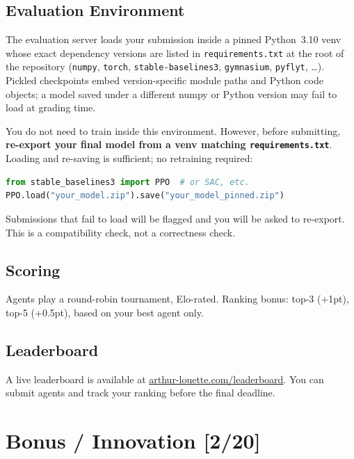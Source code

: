 \documentclass[11pt,a4paper]{article}
\newcommand{\pts}[1]{\hfill{\normalfont\normalsize\color{pts} [#1/20]}}
\begin{document}
\subsection{Evaluation Environment}
\label{sec:eval_env}

The evaluation server loads your submission inside a pinned Python~3.10 venv whose exact dependency versions are listed in \texttt{requirements.txt} at the root of the repository (\texttt{numpy}, \texttt{torch}, \texttt{stable-baselines3}, \texttt{gymnasium}, \texttt{pyflyt}, \ldots). Pickled checkpoints embed version-specific module paths and Python code objects; a model saved under a different numpy or Python version may fail to load at grading time.

You do not need to train inside this environment. However, before submitting, \textbf{re-export your final model from a venv matching \texttt{requirements.txt}}. Loading and re-saving is sufficient; no retraining required:

\begin{lstlisting}[language=Python, numbers=none]
from stable_baselines3 import PPO  # or SAC, etc.
PPO.load("your_model.zip").save("your_model_pinned.zip")
\end{lstlisting}

Submissions that fail to load will be flagged and you will be asked to re-export. This is a compatibility check, not a correctness check.

\subsection{Scoring}

Agents play a round-robin tournament, Elo-rated. Ranking bonus: top-3 (+1pt), top-5 (+0.5pt), based on your best agent only.

\subsection{Leaderboard}

A live leaderboard is available at \href{https://arthur-louette.com/leaderboard}{arthur-louette.com/leaderboard}. You can submit agents and track your ranking before the final deadline.

\section{Bonus / Innovation\pts{2}}
\label{sec:bonus}
\end{document}
